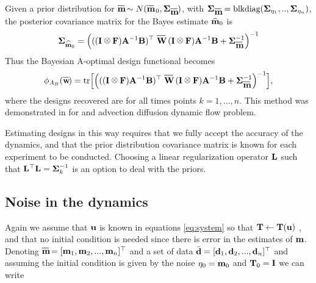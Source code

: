 \documentclass[12pt]{article}
\newcommand{\bfA}	{{\bf{A}}}
\newcommand{\bfB}	{{\bf{B}}}
\newcommand{\bfF}	{{\bf{F}}}
\newcommand{\bfI}	{{\bf{I}}}
\newcommand{\bfL}	{{\bf{L}}}
\newcommand{\bfT}	{{\bf{T}}}
\newcommand{\bfW}	{{\bf{W}}}
\newcommand{\bfd}	{{\bf{d}}}
\newcommand{\bfm}	{{\bf{m}}}
\newcommand{\bfu}	{{\bf{u}}}
\newcommand{\bfSigma}   {{\boldsymbol \Sigma}}
\newcommand{\bfmhat}    {{\widehat{\bfm}}}
\renewcommand{\bfmhat}	{\widehat{\bf m}}
\newcommand*\xbar[1]{%
  \hbox{%
    \vbox{%
      \hrule height 0.5pt %
      \kern0.5ex%
      \hbox{%
        \kern-0.em%
        \ensuremath{#1}%
        \kern-0.15em%
      }%
    }%
  }%
}
\newcommand{\mbar}	{\xbar{\bf m}}
\newcommand{\wbar}	{\xbar{\bf w}}
\def\kronecker{\raisebox{1pt}{\ensuremath{\:\otimes\:}}}
\begin{document}
Given a prior distribution for $\mbar \sim N(\mbar_{\;0},\bfSigma_{\mbar})$, with $\bfSigma_{\mbar} = \text{blkdiag}(\bfSigma_{\eta_1},..,\bfSigma_{\eta_n})$, the posterior covariance matrix for the Bayes estimate $\bfmhat_0$ is 
\begin{equation}
\label{noNoiseCov}
\bfSigma_{\bfmhat_0} = \Big(((\bfI \kronecker \bfF) \bfA^{-1} \bfB)^{\top}\;
\xbar{\bfW}\;(\bfI \kronecker \bfF) \bfA^{-1} \bfB + \bfSigma_{\mbar}^{-1}\Big)^{-1}
\end{equation}
Thus the Bayesian A-optimal design functional becomes
 \begin{equation}
  \label{AB}
  \phi_{A_B}(\wbar) = \text{tr}\Big[\Big(((\bfI \kronecker \bfF) \bfA^{-1} \bfB)^{\top}\;
\xbar{\bfW}\;(\bfI \kronecker \bfF) \bfA^{-1} \bfB + \bfSigma_{\mbar}^{-1}\Big)^{-1}\Big],
  \end{equation} 
where the designs recovered are for all times points $k=1,...,n$.
 This method was demonstrated in \cite{Alexanderian2014} for and advection diffusion dynamic flow problem.  
 
 Estimating designs in this way requires that we fully accept the accuracy of the dynamics, and that  the prior distribution covariance matrix is known for each experiment to be conducted. Choosing a linear regularization operator $\bfL$ such that $\bfL^{\top}\bfL = \bfSigma_k^{-1}$ is an option to deal with the priors.

%
%
%
\subsection{Noise in the dynamics}
\label{Kalman}
Again we assume that $\bfu$ is known in equations \eqref{eq:system} so that $ \bfT \leftarrow \bfT(\bfu)$ , and that no initial condition is needed since there is error in the estimates of $\bfm$. Denoting $\mbar = [\bfm_1,\bfm_2,...,\bfm_n]^{\top}$ and  a set of data $\bar{\bfd} = [\bfd_1,\bfd_2,...,\bfd_n]^{\top}$ and assuming the initial condition is given by the noise $\eta_0 = \bfm_0$ and $\bfT_0 = \bfI$ we can write 
\end{document}
